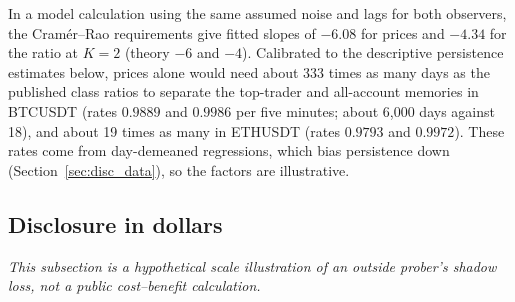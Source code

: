 \documentclass[12pt]{article}
\theoremstyle{definition}
\theoremstyle{remark}
\begin{document}
In a model calculation using the same assumed noise and lags for both observers, the Cram\'er--Rao requirements give fitted slopes of $-6.08$ for prices and $-4.34$ for the ratio at $K=2$ (theory $-6$ and $-4$). Calibrated to the descriptive persistence estimates below, prices alone would need about 333 times as many days as the published class ratios to separate the top-trader and all-account memories in BTCUSDT (rates $0.9889$ and $0.9986$ per five minutes; about 6{,}000 days against 18), and about 19 times as many in ETHUSDT (rates $0.9793$ and $0.9972$). These rates come from day-demeaned regressions, which bias persistence down (Section~\ref{sec:disc_data}), so the factors are illustrative.

\subsection{Disclosure in dollars}\label{sec:disc_dollars}
\emph{This subsection is a hypothetical scale illustration of an outside prober's shadow loss, not a public cost--benefit calculation.}
\end{document}

